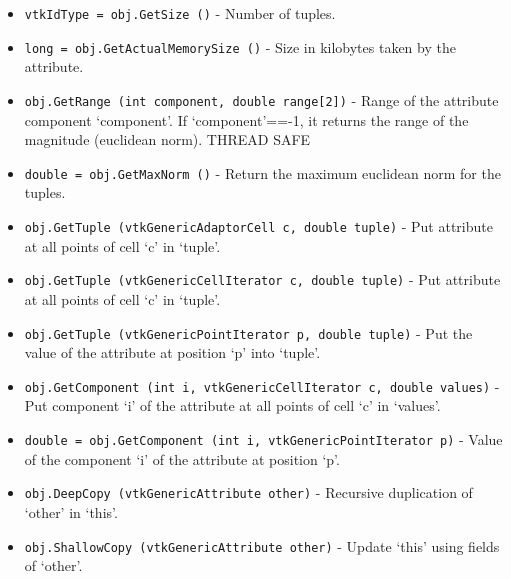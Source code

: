 \begin{itemize}
\item  \verb|vtkIdType = obj.GetSize ()| -  Number of tuples.
 

\item  \verb|long = obj.GetActualMemorySize ()| -  Size in kilobytes taken by the attribute.

\item  \verb|obj.GetRange (int component, double range[2])| -  Range of the attribute component `component'. If `component'==-1, it
 returns the range of the magnitude (euclidean norm).
 THREAD SAFE
 

\item  \verb|double = obj.GetMaxNorm ()| -  Return the maximum euclidean norm for the tuples.
 

\item  \verb|obj.GetTuple (vtkGenericAdaptorCell c, double tuple)| -  Put attribute at all points of cell `c' in `tuple'.
 
 
 
 

\item  \verb|obj.GetTuple (vtkGenericCellIterator c, double tuple)| -  Put attribute at all points of cell `c' in `tuple'.
 
 
 
 

\item  \verb|obj.GetTuple (vtkGenericPointIterator p, double tuple)| -  Put the value of the attribute at position `p' into `tuple'.
 
 
 
 

\item  \verb|obj.GetComponent (int i, vtkGenericCellIterator c, double values)| -  Put component `i' of the attribute at all points of cell `c' in `values'.
 
 
 
 
 

\item  \verb|double = obj.GetComponent (int i, vtkGenericPointIterator p)| -  Value of the component `i' of the attribute at position `p'.
 
 
 

\item  \verb|obj.DeepCopy (vtkGenericAttribute other)| -  Recursive duplication of `other' in `this'.
 
 

\item  \verb|obj.ShallowCopy (vtkGenericAttribute other)| -  Update `this' using fields of `other'.
 
 

\end{itemize}
